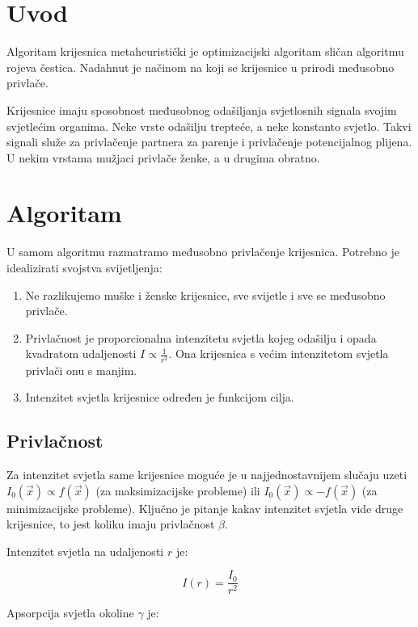 \section{Uvod}
Algoritam krijesnica\cite{10.1007/978-3-642-04944-6_14} metaheuristički je optimizacijski algoritam sličan algoritmu rojeva čestica. Nadahnut je načinom na koji se krijesnice u prirodi međusobno privlače. 

Krijesnice imaju sposobnost međusobnog odašiljanja svjetlosnih signala svojim svjetlećim organima. Neke vrste odašilju trepteće, a neke konstanto svjetlo. Takvi signali služe za privlačenje partnera za parenje i privlačenje potencijalnog plijena. U nekim vrstama mužjaci privlače ženke, a u drugima obratno.


\section{Algoritam}
U samom algoritmu razmatramo međusobno privlačenje krijesnica. Potrebno je idealizirati svojstva svijetljenja:

\begin{enumerate}
	\item Ne razlikujemo muške i ženske krijesnice, sve svijetle i sve se međusobno privlače.
	\item Privlačnost je proporcionalna intenzitetu svjetla kojeg odašilju i opada kvadratom udaljenosti $I \propto \frac{1}{r^2}$. Ona krijesnica s većim intenzitetom svjetla privlači onu s manjim.
	\item Intenzitet svjetla krijesnice određen je funkcijom cilja.
\end{enumerate}



\subsection{Privlačnost}
Za intenzitet svjetla same krijesnice moguće je u najjednostavnijem slučaju uzeti $I_0(\vec{x}) \propto f(\vec{x})$ (za maksimizacijske probleme) ili $I_0(\vec{x}) \propto -f(\vec{x})$ (za minimizacijske probleme). Ključno je pitanje kakav intenzitet svjetla vide druge krijesnice, to jest koliku imaju privlačnost $\beta$.

Intenzitet svjetla na udaljenosti $r$ je:

\begin{equation}
	I(r) = \frac{I_0}{r^2}
\end{equation}

Apsorpcija svjetla okoline $\gamma$ je:

